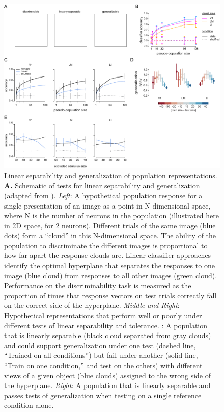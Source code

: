 \begin{figure}[t!]
    \includegraphics[width=\textwidth]{figures/chapter_4/fig_4-2_neural_generalization/fig_4-2_neural_generalization.pdf}
    \vspace{.1in}
    \caption[Population representations of objects]{Linear separability and generalization of population representations. 
    \textbf{A.} Schematic of tests for linear separability and generalization (adapted from \cite{Rust2010SelectivityIT}). \textit{Left}: A hypothetical population response for a single presentation of an image as a point in N-dimensional space, where N is the number of neurons in the population (illustrated here in 2D space, for 2 neurons). Different trials of the same image (blue dots) form a “cloud” in this N-dimensional space. The ability of the population to discriminate the different images is proportional to how far apart the response clouds are. Linear classifier approaches identify the optimal hyperplane that separates the responses to one image (blue cloud) from responses to all other images (green cloud). Performance on the discriminability task is measured as the proportion of times that response vectors on test trials correctly fall on the correct side of the hyperplane. \textit{Middle and Right}: Hypothetical representations that perform well or poorly under different tests of linear separability and tolerance. : A population that is linearly separable (black cloud separated from gray clouds) and could support generalization under one test (dashed line, “Trained on all conditions”) but fail under another (solid line, “Train on one condition,” and test on the others) with different views of a given object (blue clouds) assigned to the wrong side of the hyperplane. \textit{Right}: A population that is linearly separable and passes tests of generalization when testing on a single reference condition alone.
}
\end{figure}

